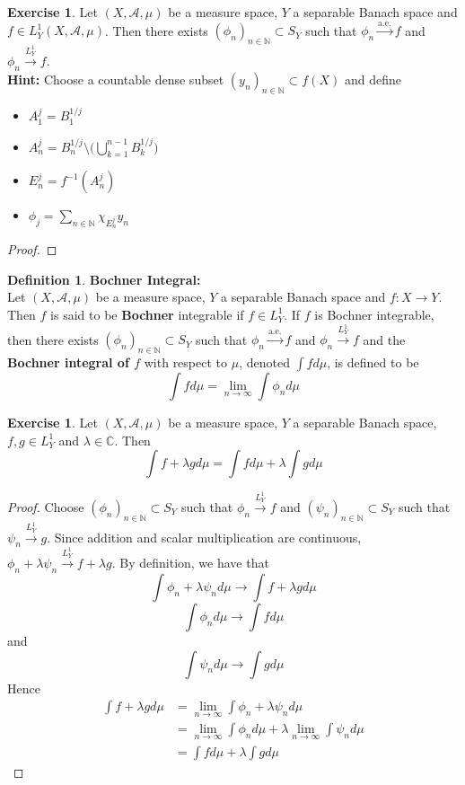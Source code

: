 \documentclass[12pt]{amsart}
\theoremstyle{definition}
\newtheorem{defn}[definition]{Definition}
\newtheorem{ex}[definition]{Exercise}
\newcommand{\lam}{\lambda}
\newcommand{\C}{\mathbb{C}}
\newcommand{\N}{\mathbb{N}}
\newcommand{\MA}{\mathcal{A}}
\newcommand{\limn}{\lim \limits_{n \rightarrow \infty}}
\newcommand{\convt}[1]{\xrightarrow{\text{#1}}}
\newcommand{\conv}[1]{\xrightarrow{#1}}
\begin{document}
	\begin{ex}
	Let $(X, \MA, \mu)$ be a measure space, $Y$ a separable Banach space and $f \in L^1_Y(X, \MA, \mu)$. Then there exists $(\phi_n)_{n \in \N} \subset S_Y$ such that $\phi_n \convt{a.e.} f$ and $\phi_n \conv{L_Y^1} f$.\\
	\textbf{Hint:} Choose a countable dense subset $(y_n)_{n \in \N} \subset f(X)$ and define 
	\begin{itemize}
	\item $A_1^j = B^{1/j}_1$ 
	\item $A_n^j = B^{1/j}_n  \setminus \bigg( \bigcup \limits_{k=1}^{n-1} B^{1/j}_k \bigg)$ 
	\item $E_n^j = f^{-1}(A^j_n)$ 
	\item $\phi_j = \sum\limits_{n \in \N}\chi_{E_n^j}y_n$
	\end{itemize}
	\end{ex}
	
	\begin{proof}
	
\end{proof}		
	
	\begin{defn}\textbf{Bochner Integral:}\\
	Let $(X, \MA, \mu)$ be a measure space, $Y$ a separable Banach space and $f:X \rightarrow Y$. Then $f$ is said to be \textbf{Bochner} integrable if $f \in L^1_Y$. If $f$ is Bochner integrable, then there exists $(\phi_n)_{n \in \N} \subset S_Y$ such that $\phi_n \convt{a.e.} f$ and $\phi_n \conv{L_Y^1} f$ and the \textbf{Bochner integral of $f$} with respect to $\mu$, denoted $\int f d\mu$, is defined to be $$\int f d\mu = \limn \int \phi_n d\mu$$ 
	\end{defn}
	
	\begin{ex}
	Let $(X, \MA, \mu)$ be a measure space, $Y$ a separable Banach space, $f,g \in L^1_Y$ and $\lam \in \C$. Then $$\int f+\lam g d\mu = \int f d \mu + \lam \int g d\mu$$
	\end{ex}
	
	\begin{proof}
	Choose $(\phi_n)_{n \in \N} \subset S_Y$ such that $\phi_n \conv{L^1_Y} f$ and $(\psi_n)_{n \in \N} \subset S_Y$ such that $\psi_n \conv{L^1_Y} g$. Since addition and  scalar multiplication are continuous, $\phi_n + \lam \psi_n \conv{L^1_Y} f+\lam g$. By definition, we have that $$\int \phi_n + \lam \psi_n  d\mu \rightarrow \int f+\lam g d\mu $$ $$\int \phi_n d\mu \rightarrow \int f d\mu$$ and $$ \int \psi_n d\mu \rightarrow \int g d\mu$$ 
	Hence 
	\begin{align*}
	\int f+ \lam g d\mu 
	&= \limn \int \phi_n + \lam \psi_n  d\mu \\
	&= \limn \int \phi_n d\mu + \lam \limn \int \psi_n  d\mu \\
	&= \int f d\mu + \lam \int g d\mu
	\end{align*}
	\end{proof}
	
\end{document}
